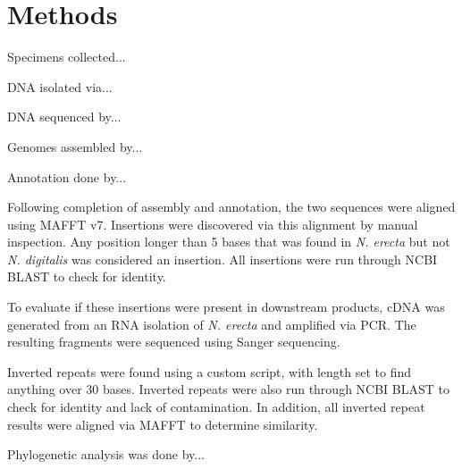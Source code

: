 \documentclass[../main.tex]{subfiles}
\begin{document}
\section{Methods}

Specimens collected...

DNA isolated via...

DNA sequenced by...

Genomes assembled by...

Annotation done by...

Following completion of assembly and annotation, the two sequences were aligned using MAFFT v7. Insertions were discovered via this alignment by manual inspection. Any position longer than 5 bases that was found in \emph{N. erecta} but not \emph{N. digitalis} was considered an insertion. All insertions were run through NCBI BLAST to check for identity.

To evaluate if these insertions were present in downstream products, cDNA was generated from an RNA isolation of \emph{N. erecta} and amplified via PCR. The resulting fragments were sequenced using Sanger sequencing.

Inverted repeats were found using a custom script, with length set to find anything over 30 bases. Inverted repeats were also run through NCBI BLAST to check for identity and lack of contamination. In addition, all inverted repeat results were aligned via MAFFT to determine similarity.

Phylogenetic analysis was done by...
\end{document}
